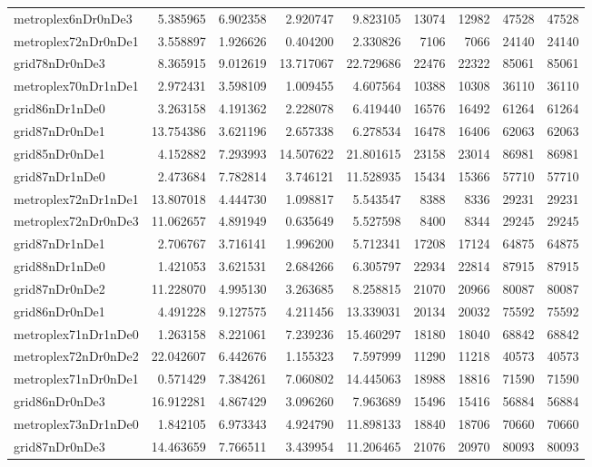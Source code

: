 \begin{longtable}{|l|r|r|r|r|r|r|r|r|}
metroplex6nDr0nDe3 & 5.385965 & 6.902358 & 2.920747 & 9.823105 & 13074 & 12982 & 47528 & 47528 \\
metroplex72nDr0nDe1 & 3.558897 & 1.926626 & 0.404200 & 2.330826 & 7106 & 7066 & 24140 & 24140 \\
grid78nDr0nDe3 & 8.365915 & 9.012619 & 13.717067 & 22.729686 & 22476 & 22322 & 85061 & 85061 \\
metroplex70nDr1nDe1 & 2.972431 & 3.598109 & 1.009455 & 4.607564 & 10388 & 10308 & 36110 & 36110 \\
grid86nDr1nDe0 & 3.263158 & 4.191362 & 2.228078 & 6.419440 & 16576 & 16492 & 61264 & 61264 \\
grid87nDr0nDe1 & 13.754386 & 3.621196 & 2.657338 & 6.278534 & 16478 & 16406 & 62063 & 62063 \\
grid85nDr0nDe1 & 4.152882 & 7.293993 & 14.507622 & 21.801615 & 23158 & 23014 & 86981 & 86981 \\
grid87nDr1nDe0 & 2.473684 & 7.782814 & 3.746121 & 11.528935 & 15434 & 15366 & 57710 & 57710 \\
metroplex72nDr1nDe1 & 13.807018 & 4.444730 & 1.098817 & 5.543547 & 8388 & 8336 & 29231 & 29231 \\
metroplex72nDr0nDe3 & 11.062657 & 4.891949 & 0.635649 & 5.527598 & 8400 & 8344 & 29245 & 29245 \\
grid87nDr1nDe1 & 2.706767 & 3.716141 & 1.996200 & 5.712341 & 17208 & 17124 & 64875 & 64875 \\
grid88nDr1nDe0 & 1.421053 & 3.621531 & 2.684266 & 6.305797 & 22934 & 22814 & 87915 & 87915 \\
grid87nDr0nDe2 & 11.228070 & 4.995130 & 3.263685 & 8.258815 & 21070 & 20966 & 80087 & 80087 \\
grid86nDr0nDe1 & 4.491228 & 9.127575 & 4.211456 & 13.339031 & 20134 & 20032 & 75592 & 75592 \\
metroplex71nDr1nDe0 & 1.263158 & 8.221061 & 7.239236 & 15.460297 & 18180 & 18040 & 68842 & 68842 \\
metroplex72nDr0nDe2 & 22.042607 & 6.442676 & 1.155323 & 7.597999 & 11290 & 11218 & 40573 & 40573 \\
metroplex71nDr0nDe1 & 0.571429 & 7.384261 & 7.060802 & 14.445063 & 18988 & 18816 & 71590 & 71590 \\
grid86nDr0nDe3 & 16.912281 & 4.867429 & 3.096260 & 7.963689 & 15496 & 15416 & 56884 & 56884 \\
metroplex73nDr1nDe0 & 1.842105 & 6.973343 & 4.924790 & 11.898133 & 18840 & 18706 & 70660 & 70660 \\
grid87nDr0nDe3 & 14.463659 & 7.766511 & 3.439954 & 11.206465 & 21076 & 20970 & 80093 & 80093 \\

\end{longtable}
